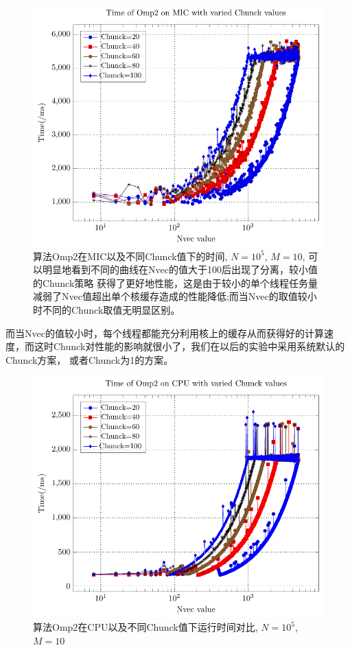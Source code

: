\begin{figure}[!t]
   \centering
   \includegraphics[width=\textwidth]{chap5/Figures/bsV2-mic-Time-Chunck.pdf}
   \caption{算法Omp2在MIC以及不同Chunck值下的时间, $N=10^5$, $M=10$, 可以明显地看到不同的曲线在Nvec的值大于100后出现了分离，较小值的Chunck策略
   获得了更好地性能，这是由于较小的单个线程任务量减弱了Nvec值超出单个核缓存造成的性能降低;而当Nvec的取值较小时不同的Chunck取值无明显区别。}
   \label{fig:v2-mic-chunck-Nvec}
\end{figure}
而当Nvec的值较小时，每个线程都能充分利用核上的缓存从而获得好的计算速度，而这时Chunck对性能的影响就很小了，我们在以后的实验中采用系统默认的Chunck方案，
或者Chunck为1的方案。
\begin{figure}[!t]
   \centering
   \includegraphics[width=\textwidth]{chap5/Figures/bsV2-CPU-Time-Chunck.pdf}
   \caption{算法Omp2在CPU以及不同Chunck值下运行时间对比, $N=10^5$, $M=10$}
   \label{fig:v2-cpu-chunck-Nvec}
\end{figure}

